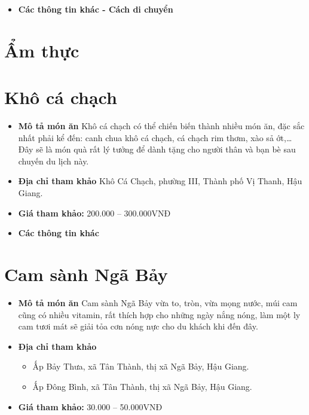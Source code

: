 \documentclass{article}
\begin{document}
\begin{itemize}
    \item{\textbf{Các thông tin khác - Cách di chuyển}}
\end{itemize}


\newpage
\section*{{Ẩm thực}}
\setcounter{section}{0}

\section{Khô cá chạch}
\begin{itemize}
    \item{\textbf{Mô tả món ăn}} Khô cá chạch có thể chiến biến thành nhiều món ăn, đặc sắc nhất phải kể đến: canh chua khô cá chạch, cá chạch rim thơm, xào sả ớt,… Đây sẽ là món quà rất lý tưởng để dành tặng cho người thân và bạn bè sau chuyến du lịch này.
    \item{\textbf{Địa chỉ tham khảo}} Khô Cá Chạch, phường III, Thành phố Vị Thanh, Hậu Giang.
    \item{\textbf{Giá tham khảo:}} 200.000 – 300.000VNĐ
\end{itemize}

\begin{itemize}
    \item{\textbf{Các thông tin khác}}
\end{itemize}

\section{Cam sành Ngã Bảy}
\begin{itemize}
    \item{\textbf{Mô tả món ăn}} Cam sành Ngã Bảy vừa to, tròn, vừa mọng nước, múi cam cũng có nhiều vitamin, rất thích hợp cho những ngày nắng nóng, làm một ly cam tươi mát sẽ giải tỏa cơn nóng nực cho du khách khi đến đây.
    \item{\textbf{Địa chỉ tham khảo}}
          \begin{itemize}
              \item Ấp Bảy Thưa, xã Tân Thành, thị xã Ngã Bảy, Hậu Giang.
              \item Ấp Đông Bình, xã Tân Thành, thị xã Ngã Bảy, Hậu Giang.
          \end{itemize}
    \item{\textbf{Giá tham khảo:}} 30.000 – 50.000VNĐ
\end{itemize}
\end{document}
